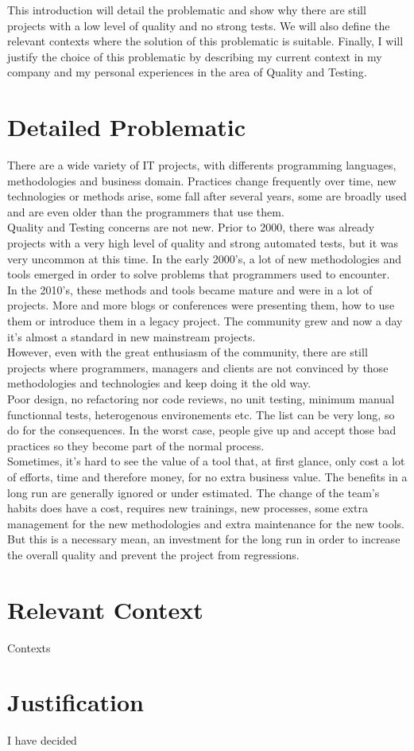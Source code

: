 This introduction will detail the problematic and show why there are
still projects with a low level of quality and no strong tests.
We will also define the relevant contexts where the solution of this
problematic is suitable.
Finally, I will justify the choice of this problematic by describing my
current context in my company and my personal experiences in the area of
Quality and Testing.
\section{Detailed Problematic}\label{sec:detailed-problematic}
There are a wide variety of IT projects, with differents programming
languages, methodologies and business domain.
Practices change frequently over time, new technologies or methods arise,
some fall after several years, some are broadly used and are even older
than the programmers that use them. \\
Quality and Testing concerns are not new. Prior to 2000, there was already
projects with a very high level of quality and strong automated tests, but
it was very uncommon at this time. In the early 2000's, a lot of new
methodologies and tools emerged in order to solve problems that
programmers used to encounter. \\
In the 2010's, these methods and tools became mature and were in a
lot of projects. More and more blogs or conferences were presenting them,
how to use them or introduce them in a legacy project. The community grew
and now a day it's almost a standard in new mainstream projects. \\
\newline
However, even with the great enthusiasm of the community, there are still
projects where programmers, managers and clients are not convinced by
those methodologies and technologies and keep doing it the old way. \\
Poor design, no refactoring nor code reviews, no unit testing, minimum
manual functionnal tests, heterogenous environements etc. The list can
be very long, so do for the consequences. In the worst case, people give up
and accept those bad practices so they become part of the normal process. \\
Sometimes, it's hard to see the value of a tool that, at first glance, only
cost a lot of efforts, time and therefore money, for no extra business value.
The benefits in a long run are generally ignored or under estimated.
The change of the team's habits does have a cost, requires new trainings,
new processes, some extra management for the new methodologies and
extra maintenance for the new tools. But this is a necessary mean, an
investment for the long run in order to increase the overall quality and
prevent the project from regressions.

\section{Relevant Context}\label{sec:relevant-context}
Contexts

\section{Justification}\label{sec:justification}
I have decided